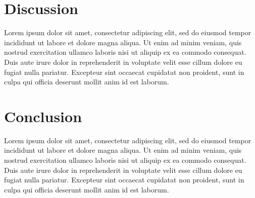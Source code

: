 \documentclass[preprint, 3p,
authoryear]{elsarticle} %
\begin{document}
\hypertarget{discussion}{%
\section{Discussion}\label{discussion}}

Lorem ipsum dolor sit amet, consectetur adipiscing elit, sed do eiusmod
tempor incididunt ut labore et dolore magna aliqua. Ut enim ad minim
veniam, quis nostrud exercitation ullamco laboris nisi ut aliquip ex ea
commodo consequat. Duis aute irure dolor in reprehenderit in voluptate
velit esse cillum dolore eu fugiat nulla pariatur. Excepteur sint
occaecat cupidatat non proident, sunt in culpa qui officia deserunt
mollit anim id est laborum.

\hypertarget{conclusion}{%
\section{Conclusion}\label{conclusion}}

Lorem ipsum dolor sit amet, consectetur adipiscing elit, sed do eiusmod
tempor incididunt ut labore et dolore magna aliqua. Ut enim ad minim
veniam, quis nostrud exercitation ullamco laboris nisi ut aliquip ex ea
commodo consequat. Duis aute irure dolor in reprehenderit in voluptate
velit esse cillum dolore eu fugiat nulla pariatur. Excepteur sint
occaecat cupidatat non proident, sunt in culpa qui officia deserunt
mollit anim id est laborum.

\renewcommand\refname{References}

\end{document}
